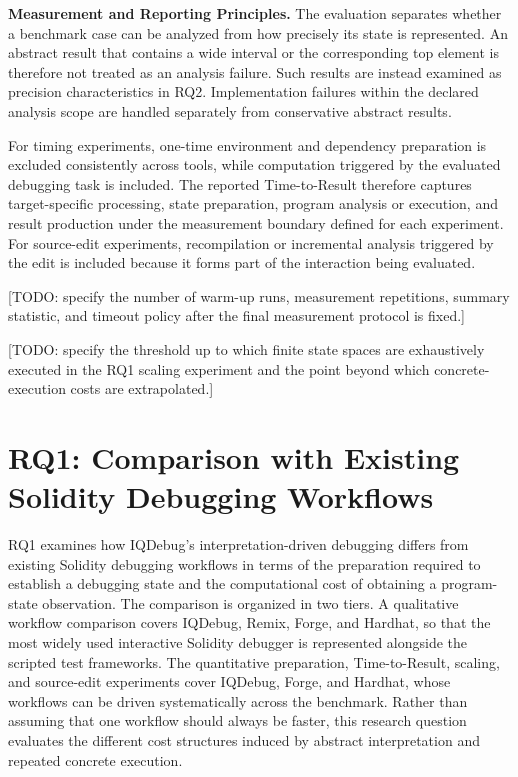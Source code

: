 \documentclass[11pt,oneside]{report}
\theoremstyle{plain}
\theoremstyle{definition}
\theoremstyle{remark}
\begin{document}
\smallskip
\noindent\textbf{Measurement and Reporting Principles.}
The evaluation separates whether a benchmark case can be analyzed from how precisely its state is represented.
An abstract result that contains a wide interval or the corresponding top element is therefore not treated as an analysis failure.
Such results are instead examined as precision characteristics in RQ2.
Implementation failures within the declared analysis scope are handled separately from conservative abstract results.

For timing experiments, one-time environment and dependency preparation is excluded consistently across tools, while computation triggered by the evaluated debugging task is included.
The reported Time-to-Result therefore captures target-specific processing, state preparation, program analysis or execution, and result production under the measurement boundary defined for each experiment.
For source-edit experiments, recompilation or incremental analysis triggered by the edit is included because it forms part of the interaction being evaluated.

[TODO: specify the number of warm-up runs, measurement repetitions, summary statistic, and timeout policy after the final measurement protocol is fixed.]

[TODO: specify the threshold up to which finite state spaces are exhaustively executed in the RQ1 scaling experiment and the point beyond which concrete-execution costs are extrapolated.]

\section{RQ1: Comparison with Existing Solidity Debugging Workflows}
\label{sec:eval:rq1}

RQ1 examines how IQDebug's interpretation-driven debugging differs from existing Solidity debugging workflows in terms of the preparation required to establish a debugging state and the computational cost of obtaining a program-state observation. The comparison is organized in two tiers. A qualitative workflow comparison covers IQDebug, Remix, Forge, and Hardhat, so that the most widely used interactive Solidity debugger is represented alongside the scripted test frameworks. The quantitative preparation, Time-to-Result, scaling, and source-edit experiments cover IQDebug, Forge, and Hardhat, whose workflows can be driven systematically across the benchmark. Rather than assuming that one workflow should always be faster, this research question evaluates the different cost structures induced by abstract interpretation and repeated concrete execution.
\end{document}
